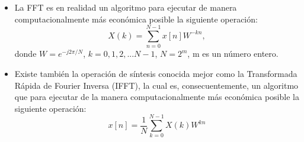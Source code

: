 \begin{itemize}
    \item La FFT es en realidad un algoritmo para ejecutar de manera computacionalmente más económica posible la siguiente operación:
    \begin{equation} \label{equ_fft}
			 X(k) = \sum_{n=0}^{N-1}x[n]W^{-kn},
    \end{equation} donde  $W=e^{-j2 \pi/N}$, $k=0,1,2, ... N-1$, $N = 2^m$, m es un número entero.
    \item Existe también la operación de síntesis conocida mejor como la Transformada Rápida de Fourier Inversa (IFFT), la cual es, consecuentemente, un algoritmo que para ejecutar de la manera computacionalmente más económica posible la siguiente operación:
    \begin{equation} \label{equ_ifft}
			 x[n] = \frac{1}{N} \sum_{k=0}^{N-1}X(k) W^{kn}
     \end{equation}
    

\end{itemize}
